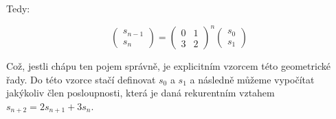 \documentclass{../../../ksp}
\begin{document}
Tedy:

\begin{equation}
    \begin{pmatrix}
        s_{n-1}\\
        s_{n}
    \end{pmatrix}
    =
    \begin{pmatrix}
        0 & 1\\
        3 & 2
    \end{pmatrix}
    ^n
    \begin{pmatrix}
        s_{0}\\
        s_{1}
    \end{pmatrix}
\end{equation}

Což, jestli chápu ten pojem správně, je explicitním vzorcem této geometrické řady.
Do této vzorce stačí definovat $s_0$ a $s_1$ a následně můžeme vypočítat jakýkoliv člen posloupnosti, která je daná
rekurentním vztahem $s_{n+2} = 2s_{n+1} + 3s_n$.
\end{document}
